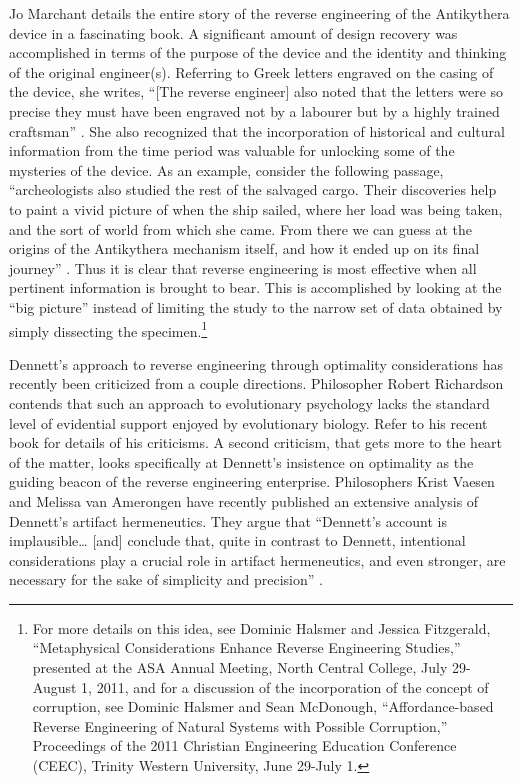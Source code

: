 Jo Marchant details the entire story of the reverse engineering of the
Antikythera device in a fascinating book.\citep{marchant2009} A
significant amount of design recovery was accomplished in terms of the
purpose of the device and the identity and thinking of the original
engineer(s). Referring to Greek letters engraved on the casing of the
device, she writes, “[The reverse engineer] also noted that the letters
were so precise they must have been engraved not by a labourer but by a
highly trained craftsman” \citep[][pg. 55]{marchant2009}. She also recognized that
the incorporation of historical and cultural information from the time
period was valuable for unlocking some of the mysteries of the device.
As an example, consider the following passage, “archeologists also
studied the rest of the salvaged cargo. Their discoveries help to paint
a vivid picture of when the ship sailed, where her load was being
taken, and the sort of world from which she came. From there we can
guess at the origins of the Antikythera mechanism itself, and how it
ended up on its final journey” \citep[][pg. 61]{marchant2009}. Thus it is clear
that reverse engineering is most effective when all pertinent
information is brought to bear. This is accomplished by looking at the
“big picture” instead of limiting the study to the narrow set of data
obtained by simply dissecting the specimen.\footnote{
For more details on this idea, see Dominic Halsmer
and Jessica Fitzgerald, ``Metaphysical Considerations Enhance Reverse
Engineering Studies,'' presented at the ASA Annual Meeting, North
Central College, July 29-August 1, 2011, and for a discussion of the
incorporation of the concept of corruption, see Dominic Halsmer and
Sean McDonough, ``Affordance-based Reverse Engineering of Natural
Systems with Possible Corruption,'' Proceedings of the 2011 Christian
Engineering Education Conference (CEEC), Trinity Western University,
June 29-July 1.
}

Dennett’s approach to reverse engineering through optimality
considerations has recently been criticized from a couple directions.
Philosopher Robert Richardson contends that such an approach to
evolutionary psychology lacks the standard level of evidential support
enjoyed by evolutionary biology. Refer to his recent
book\citep{richardson2007} for details of his criticisms. A second
criticism, that gets more to the heart of the matter, looks
specifically at Dennett’s insistence on optimality as the guiding
beacon of the reverse engineering enterprise. Philosophers Krist Vaesen
and Melissa van Amerongen have recently published an extensive analysis
of Dennett’s artifact hermeneutics. They argue that “Dennett’s account
is implausible{\ldots} [and] conclude that, quite in contrast to Dennett,
intentional considerations play a crucial role in artifact
hermeneutics, and even stronger, are necessary for the sake of
simplicity and precision” \citep[][pg. 779]{vaesenamerongen2008}.

